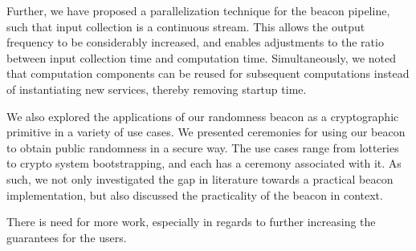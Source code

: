Further, we have proposed a parallelization technique for the beacon pipeline, such that input collection is a continuous stream.
This allows the output frequency to be considerably increased, and enables adjustments to the ratio between input collection time and computation time.
Simultaneously, we noted that computation components can be reused for subsequent computations instead of instantiating new services, thereby removing startup time.

We also explored the applications of our randomness beacon as a cryptographic primitive in a variety of use cases.
We presented ceremonies for using our beacon to obtain public randomness in a secure way.
The use cases range from lotteries to crypto system bootstrapping, and each has a ceremony associated with it.
As such, we not only investigated the gap in literature towards a practical beacon implementation, but also discussed the practicality of the beacon in context.



There is need for more work, especially in regards to further increasing the guarantees for the users.


